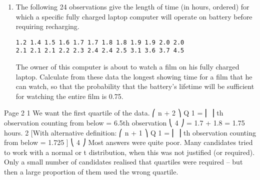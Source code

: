\documentclass[a4paper,12pt]{article}
\begin{document}
\begin{enumerate}

\item The following 24 observations give the length of time (in hours, ordered) for which a
specific fully charged laptop computer will operate on battery before requiring
recharging.
\begin{verbatim}
1.2 1.4 1.5 1.6 1.7 1.7 1.8 1.8 1.9 1.9 2.0 2.0
2.1 2.1 2.1 2.2 2.3 2.4 2.4 2.5 3.1 3.6 3.7 4.5
\end{verbatim}

The owner of this computer is about to watch a film on his fully charged laptop.
Calculate from these data the longest showing time for a film that he can watch, so
that the probability that the battery's lifetime will be sufficient for watching the entire
film is 0.75.

\end{enumerate}
\newpage
Page 2%
1
We want the first quartile of the data.
⎛ n + 2 ⎞
Q 1 = ⎜
⎟ th observation counting from below = 6.5th observation
⎝ 4 ⎠
=
1.7 + 1.8
= 1.75 hours.
2
[With alternative definition:
⎛ n + 1 ⎞
Q 1 = ⎜
⎟ th observation counting from below = 1.725 ]
⎝ 4 ⎠
Most answers were quite poor. Many candidates tried to work with a normal or t distribution,
when this was not justified (or required). Only a small number of candidates realised that
quartiles were required – but then a large proportion of them used the wrong quartile.
\end{document}

